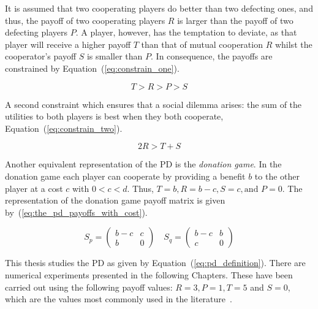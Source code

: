 It is assumed that two cooperating players do better than two defecting ones,
and thus, the payoff of two cooperating players \(R\) is
larger than the payoff of two defecting players \(P\). A player, however, has the
temptation to deviate, as that player will receive a higher payoff \(T\) than
that of mutual cooperation \(R\) whilst the cooperator's payoff \(S\) is smaller than
\(P\). In consequence, the payoffs are constrained by
Equation~(\ref{eq:constrain_one}).

\begin{equation}\label{eq:constrain_one}
    T > R > P > S
\end{equation}

A second constraint which ensures that a social dilemma arises: the sum
of the utilities to both players is best when they both cooperate,
Equation~(\ref{eq:constrain_two}).

\begin{equation}\label{eq:constrain_two}
    2R > T + S
\end{equation}

Another equivalent representation of the PD is the \textit{donation game}.
In the donation game each player can cooperate by providing a benefit \(b\) to
the other player at a cost \(c\) with \(0 < c < d\). Thus, \(T=b, R=b-c,S=c,
\text{and } P=0\). The representation of the donation game payoff matrix is
given by~(\ref{eq:the_pd_payoffs_with_cost}).

\begin{equation}\label{eq:the_pd_payoffs_with_cost}
    S_p =
    \begin{pmatrix}
        b - c & c\\
        b & 0
    \end{pmatrix}
    \quad
    S_q =
    \begin{pmatrix}
        b - c & b  \\
        c & 0
    \end{pmatrix}
\end{equation}

This thesis studies the PD as given by Equation~(\ref{eq:pd_definition}). There
are numerical experiments presented in the following Chapters. These have been
carried out using the following payoff values: \(R = 3, P = 1, T = 5\) and \(S =
0\), which are the values most commonly used in the
literature~\cite{Adami2013, Axelrod1984,  Beaufils1988, Bendor1991, Donninger1986,
Franken2005, Knight2017, Harper2017, kendall2007iterated, Knight2018, Li2007,
A.Rogers2007Ctpw, Stewart2012}.

